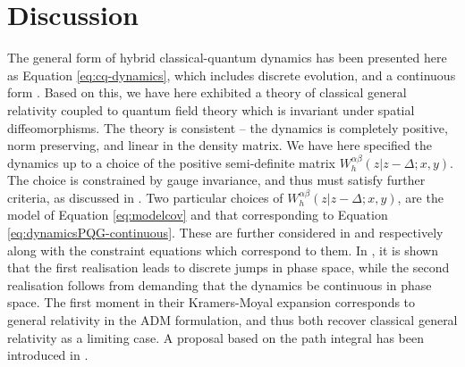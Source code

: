 \documentclass[aps,pra,showpacs,citeautoscript,amsmath,amssymb,floatfix,superscriptaddress,bbm, verbatim,amsfonts,changes,11pt,nofootinbib,longbibliography]{revtex4-2}
\def\z{{z}}
\def\dist{{\Delta}}
\def\rate{{W}}
\def\ab{^{\alpha\beta}}
\begin{document}
\section{Discussion}
\label{sec:discussion}

The general form of hybrid classical-quantum dynamics has been presented here as Equation \eqref{eq:cq-dynamics}, which includes discrete evolution, and a continuous form \cite{UCLPawula}. Based on this, we have here exhibited a theory of classical general relativity coupled to quantum field theory which is invariant under spatial diffeomorphisms. The theory is consistent -- the dynamics is completely positive, norm preserving, and linear in the density matrix. We have here specified the dynamics up to a choice of the positive semi-definite matrix $\rate\ab_{h}(\z|\z-\dist;x,y)$.
The choice is constrained by gauge invariance, and thus must satisfy further criteria, as discussed in  \cite{UCL2022constraints}. Two particular choices of $\rate\ab_{h}(\z|\z-\dist;x,y)$, are the model of Equation \eqref{eq:modelcov} and that corresponding to Equation \eqref{eq:dynamicsPQG-continuous}. These are further considered in  \cite{UCL2022constraints} and  \cite{oppenheim2021gravitationally,oppenheim2021constraints} respectively along with the constraint equations which correspond to them.
In  \cite{UCLPawula}, it is shown that the first realisation leads to discrete jumps in phase space, while the second realisation follows from demanding that the dynamics be continuous in phase space.  The first moment in their Kramers-Moyal expansion corresponds to general relativity in the ADM formulation, and thus both recover classical general relativity as a limiting case. \label{par:realisations}  A proposal based on the path integral has been introduced in  \cite{oppenheim2023covariant}.
\end{document}
